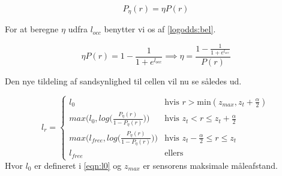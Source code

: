 \begin{equation}
	P_\eta(r) = \eta P(r) 
\end{equation}

For at beregne $\eta$ udfra $l_{occ}$ benytter vi os af \cref{logodds:bel}.

\begin{equation}
	\eta P(r) = 1 - \frac{1}{1+e^{l_{occ}}} \implies \eta = \frac{1-\frac{1}{1+e^{l_{occ}}}}{P(r)}
\end{equation}


Den nye tildeling af sandsynlighed til cellen vil nu se således ud.

\begin{equation}
	l_{r} = \begin{cases} 
		l_0 &\text{hvis }r > \text{min}(z_{max},z_t+\frac{\alpha}{2}) \\
		max\Bigg(l_{0},log\Big(\frac{P_\eta(r)}{1-P_\eta(r)}\Big)\Bigg) &\text{hvis } z_t < r \leq z_t+\frac{\alpha}{2} \\
		max\Bigg(l_{free},log\Big(\frac{P_\eta(r)}{1-P_\eta(r)}\Big)\Bigg) &\text{hvis } z_t-\frac{\alpha}{2} \leq r \leq z_t \\
		l_{free} &\text{ellers}	
	\end{cases} 
\end{equation}
Hvor $l_0$ er defineret i \cref{eqn:l0} og $z_{max}$ er sensorens maksimale måleafstand.




